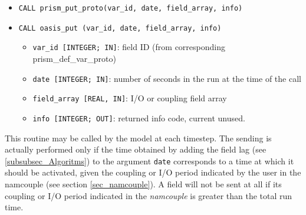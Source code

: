 \begin{itemize} 
 
\item {\tt CALL prism\_put\_proto(var\_id, date, field\_array, info)}
\item {\tt CALL oasis\_put       (var\_id, date, field\_array, info)}
\begin{itemize}
\item {\tt var\_id [INTEGER; IN]}: field ID (from
  corresponding prism\_def\_var\_proto)
\item {\tt date [INTEGER; IN]}: number of seconds in the run at the
time of the call
\item {\tt field\_array [REAL, IN]}: I/O or coupling field array 
\item {\tt info [INTEGER; OUT]}: returned info code, current unused.
\end{itemize}
\end{itemize}

This routine may be called by the model at each timestep. The sending
is actually performed only if the time obtained by adding the field
lag (see \ref{subsubsec_Algoritms}) to the argument {\tt date}
corresponds to a time at which it should be activated, given the
coupling or I/O period indicated by the user in the namcouple (see
section \ref{sec_namcouple}). A field will not be sent at all if its
coupling or I/O period indicated in the {\it namcouple} is greater
than the total run time.

